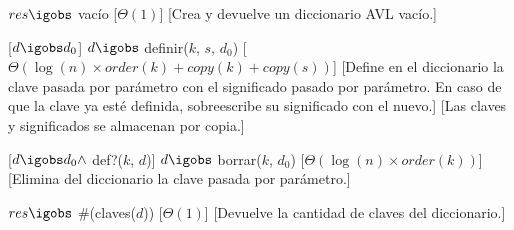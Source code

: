 \begin{Interfaz}
  
  \begin{paramFormales}
    \paramGeneros{$\kappa$, $\sigma$}




  \end{paramFormales}


  \generos{\tipo{\diccLogKS}}


    {$res \igobs$ vac\'io}
    [$\Theta(1)$]
    [Crea y devuelve un diccionario AVL vac\'io.]

    [$d \igobs d_0$]
    {$d \igobs$ definir($k$, $s$, $d_0$)}
    [$\Theta(\log(n) \times order(k) + copy(k) + copy(s))$]
    [Define en el diccionario la clave pasada por par\'ametro con el significado pasado por par\'ametro. En caso de que la clave ya est\'e definida, sobreescribe su significado con el nuevo.]
    [Las claves y significados se almacenan por copia.]

    [$d \igobs d_0 \land$ def?($k$, $d$)]
    {$d \igobs$ borrar($k$, $d_0$)}
    [$\Theta(\log(n) \times order(k))$]
    [Elimina del diccionario la clave pasada por par\'ametro.]

    {$res \igobs$ \#(claves($d$))}
    [$\Theta(1)$]
    [Devuelve la cantidad de claves del diccionario.]


\end{Interfaz}
